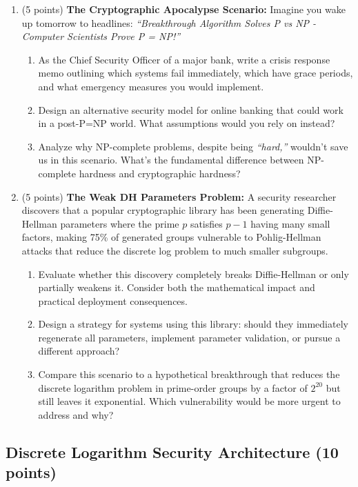 \documentclass[10pt,a4paper,american]{article}
\begin{document}
\begin{enumerate}
	\item (5 points) \textbf{The Cryptographic Apocalypse Scenario:}
	      Imagine you wake up tomorrow to headlines: \textit{``Breakthrough Algorithm Solves P vs NP - Computer Scientists Prove P = NP!''}
	      \begin{enumerate}
		      \item As the Chief Security Officer of a major bank, write a crisis response memo outlining which systems fail immediately, which have grace periods, and what emergency measures you would implement.
		      \item Design an alternative security model for online banking that could work in a post-P=NP world. What assumptions would you rely on instead?
		      \item Analyze why NP-complete problems, despite being \textit{``hard,''} wouldn't save us in this scenario. What's the fundamental difference between NP-complete hardness and cryptographic hardness?
	      \end{enumerate}
	\item (5 points) \textbf{The Weak DH Parameters Problem:}
	      A security researcher discovers that a popular cryptographic library has been generating Diffie-Hellman parameters where the prime $p$ satisfies $p-1$ having many small factors, making 75\% of generated groups vulnerable to Pohlig-Hellman attacks that reduce the discrete log problem to much smaller subgroups.
	      \begin{enumerate}
		      \item Evaluate whether this discovery completely breaks Diffie-Hellman or only partially weakens it. Consider both the mathematical impact and practical deployment consequences.
		      \item Design a strategy for systems using this library: should they immediately regenerate all parameters, implement parameter validation, or pursue a different approach?
		      \item Compare this scenario to a hypothetical breakthrough that reduces the discrete logarithm problem in prime-order groups by a factor of $2^{20}$ but still leaves it exponential. Which vulnerability would be more urgent to address and why?
	      \end{enumerate}
\end{enumerate}

\subsection{Discrete Logarithm Security Architecture (10 points)}
\end{document}
